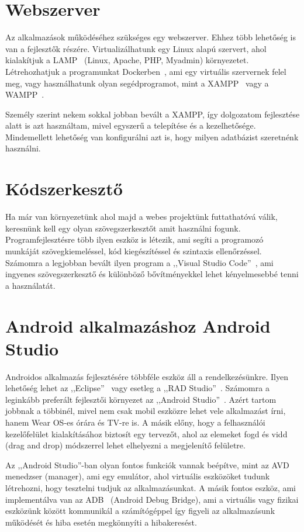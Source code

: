 \documentclass[
]{thesis-ekf}
\theoremstyle{definition}
\theoremstyle{remark}
\begin{document}
	\section{Webszerver}
	Az alkalmazások működéséhez szükséges egy webszerver. Ehhez több lehetőség is van a fejlesztők részére. Virtualizálhatunk egy Linux alapú szervert, ahol kialakítjuk a LAMP~\cite{lamp_book} (Linux, Apache, PHP, Myadmin) környezetet. Létrehozhatjuk a programunkat Dockerben~\cite{docker_doc}, ami egy virtuális szervernek felel meg, vagy használhatunk olyan segédprogramot, mint a XAMPP~\cite{xampp_doc} vagy a WAMPP~\cite{wamp_doc}. 
	
	Személy szerint nekem sokkal jobban bevált a XAMPP, így dolgozatom fejlesztése alatt is azt használtam, mivel egyszerű a telepítése és a kezelhetősége. Mindemellett lehetőség van konfigurálni azt is, hogy milyen adatbázist szeretnénk használni. 
	
	\section{Kódszerkesztő}
	Ha már van környezetünk ahol majd a webes projektünk futtathatóvá válik, keresnünk kell egy olyan szövegszerkesztőt amit használni fogunk. Programfejlesztésre több ilyen eszköz is létezik, ami segíti a programozó munkáját szövegkiemeléssel, kód kiegészítéssel és szintaxis ellenőrzéssel. Számomra a legjobban bevált ilyen program a ,,Visual Studio Code''~\cite{vsc_doc}, ami ingyenes szövegszerkesztő és különböző bővítményekkel lehet kényelmesebbé tenni a használatát.
	
	\section{Android alkalmazáshoz Android Studio}
	Androidos alkalmazás fejlesztésére többféle eszköz áll a rendelkezésünkre. Ilyen lehetőség lehet az ,,Eclipse''~\cite{eclipse_doc} vagy esetleg a ,,RAD Studio''~\cite{rad_doc}. Számomra a leginkább preferált fejlesztői környezet az ,,Android Studio''~\cite{androidStudio_doc}. Azért tartom jobbnak a többinél, mivel nem csak mobil eszközre lehet vele alkalmazást írni, hanem Wear OS-es órára és TV-re is. A másik előny, hogy a felhasználói kezelőfelület kialakításához biztosít egy tervezőt, ahol az elemeket fogd és vidd (drag and drop) módszerrel lehet elhelyezni a megjelenítő felületre. 
	
	Az ,,Android Studio''-ban olyan fontos funkciók vannak beépítve, mint az AVD~\cite{androidStudioAvd_doc} menedzser (manager), ami egy emulátor, ahol virtuális eszközöket tudunk létrehozni, hogy tesztelni tudjuk az alkalmazásunkat. A másik fontos eszköz, ami implementálva van az ADB~\cite{androidStudioAdb_doc} (Android Debug Bridge), ami a virtuális vagy fizikai eszközünk között kommunikál a számítógéppel így figyeli az alkalmazásunk működését és hiba esetén megkönnyíti a hibakeresést. 
	
\end{document}
